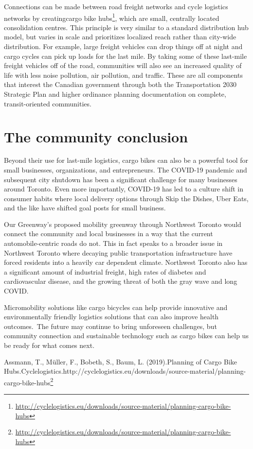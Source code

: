 \documentclass[letter]{ourGreenwayBrand}
\begin{document}
Connections can be made between road freight networks and cycle logistics networks by creatingcargo bike hubs\footnote{\url{http://cyclelogistics.eu/downloads/source-material/planning-cargo-bike-hubs}}, which are small, centrally located consolidation centres. This principle is very similar to a standard distribution hub model, but varies in scale and prioritizes localized reach rather than city-wide distribution. For example, large freight vehicles can drop things off at night and cargo cycles can pick up loads for the last mile. By taking some of these last-mile freight vehicles off of the road, communities will also see an increased quality of life with less noise pollution, air pollution, and traffic. These are all components that interest the Canadian government through both the Transportation 2030 Strategic Plan and higher ordinance planning documentation on complete, transit-oriented communities.

\section{The community conclusion}
Beyond their use for last-mile logistics, cargo bikes can also be a powerful tool for small businesses, organizations, and entrepreneurs. The COVID-19 pandemic and subsequent city shutdown has been a significant challenge for many businesses around Toronto. Even more importantly, COVID-19 has led to a culture shift in consumer habits where local delivery options through Skip the Dishes, Uber Eats, and the like have shifted goal posts for small business.

Our Greenway’s proposed mobility greenway through Northwest Toronto would connect the community and local businesses in a way that the current automobile-centric roads do not. This in fact speaks to a broader issue in Northwest Toronto where decaying public transportation infrastructure have forced residents into a heavily car dependent climate. Northwest Toronto also has a significant amount of industrial freight, high rates of diabetes and cardiovascular disease, and the growing threat of both the gray wave and long COVID.

Micromobility solutions like cargo bicycles can help provide innovative and environmentally friendly logistics solutions that can also improve health outcomes. The future may continue to bring unforeseen challenges, but community connection and sustainable technology such as cargo bikes can help us be ready for what comes next.

Assmann, T., Müller, F., Bobeth, S., Baum, L. (2019).Planning of Cargo Bike Hubs.Cyclelogistics.http://cyclelogistics.eu/downloads/source-material/planning-cargo-bike-hubs\footnote{\url{http://cyclelogistics.eu/downloads/source-material/planning-cargo-bike-hubs}}
\end{document}
